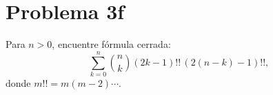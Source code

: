 \section*{Problema 3f}
Para \(n>0\), encuentre fórmula cerrada:
\[\sum_{k=0}^n \binom{n}{k}(2k-1)!!\,(2(n-k)-1)!!,\]
donde \(m!! = m(m-2)\cdots\).
